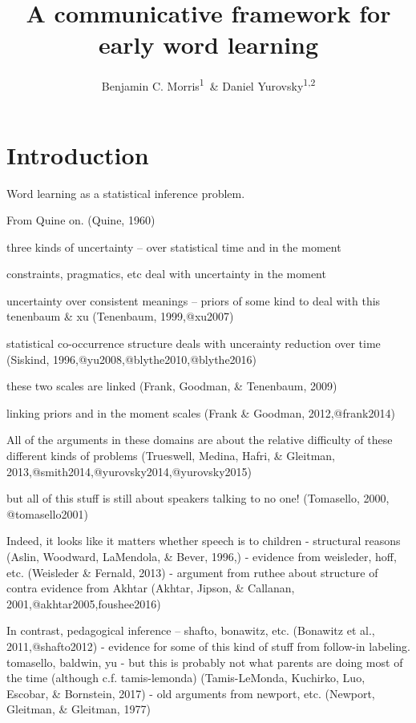 \documentclass[english,,man,floatsintext]{apa6}
\title{A communicative framework for early word learning}
\author{Benjamin C. Morris\textsuperscript{1}~\& Daniel Yurovsky\textsuperscript{1,2}}
\date{}
\affiliation{
\vspace{0.5cm}
\textsuperscript{1} University of Chicago\\\textsuperscript{1} Carnegie Mellon University}
\begin{document}
\maketitle

\hypertarget{introduction}{%
\section{Introduction}\label{introduction}}

Word learning as a statistical inference problem.

From Quine on. (Quine, 1960)

three kinds of uncertainty -- over statistical time and in the moment

constraints, pragmatics, etc deal with uncertainty in the moment

uncertainty over consistent meanings -- priors of some kind to deal with this tenenbaum \& xu
(Tenenbaum, 1999,@xu2007)

statistical co-occurrence structure deals with uncerainty reduction over time
(Siskind, 1996,@yu2008,@blythe2010,@blythe2016)

these two scales are linked (Frank, Goodman, \& Tenenbaum, 2009)

linking priors and in the moment scales (Frank \& Goodman, 2012,@frank2014)

All of the arguments in these domains are about the relative difficulty of these different kinds of problems (Trueswell, Medina, Hafri, \& Gleitman, 2013,@smith2014,@yurovsky2014,@yurovsky2015)

but all of this stuff is still about speakers talking to no one! (Tomasello, 2000, @tomasello2001)

Indeed, it looks like it matters whether speech is to children
- structural reasons (Aslin, Woodward, LaMendola, \& Bever, 1996,)
- evidence from weisleder, hoff, etc. (Weisleder \& Fernald, 2013)
- argument from ruthee about structure of contra evidence from Akhtar (Akhtar, Jipson, \& Callanan, 2001,@akhtar2005,foushee2016)

In contrast, pedagogical inference -- shafto, bonawitz, etc. (Bonawitz et al., 2011,@shafto2012)
- evidence for some of this kind of stuff from follow-in labeling. tomasello, baldwin, yu
- but this is probably not what parents are doing most of the time (although c.f. tamis-lemonda) (Tamis-LeMonda, Kuchirko, Luo, Escobar, \& Bornstein, 2017)
- old arguments from newport, etc. (Newport, Gleitman, \& Gleitman, 1977)
\end{document}
